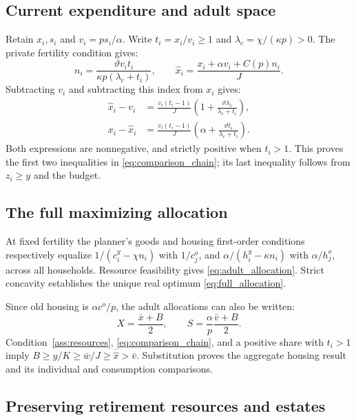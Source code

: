 \documentclass[11pt]{article}
\newcommand{\avg}[1]{\overline{#1}}
\begin{document}
\subsection{Current expenditure and adult space}

Retain $x_i,s_i$ and $v_i=ps_i/\alpha$. Write $t_i=x_i/v_i\ge1$ and
$\lambda_c=\chi/(\kappa p)>0$. The private fertility condition gives:
\begin{equation}
n_i=\frac{\vartheta v_i t_i}{\kappa p(\lambda_c+t_i)},\qquad
\widehat x_i=\frac{x_i+\alpha v_i+C(p)n_i}{J}.
\label{eq:index_identity}
\end{equation}
Subtracting $v_i$ and subtracting this index from $x_i$ gives:
\begin{align}
\widehat x_i-v_i
 &=\frac{v_i(t_i-1)}{J}
   \left(1+\frac{\vartheta\lambda_c}{\lambda_c+t_i}\right),\\
x_i-\widehat x_i
 &=\frac{v_i(t_i-1)}{J}
   \left(\alpha+\frac{\vartheta t_i}{\lambda_c+t_i}\right).
\end{align}
Both expressions are nonnegative, and strictly positive when $t_i>1$.
This proves the first two inequalities in \eqref{eq:comparison_chain};
its last inequality follows from $z_i\ge y$ and the budget.

\subsection{The full maximizing allocation}

At fixed fertility the planner's goods and housing first-order conditions
respectively equalize $1/(c_i^y-\chi n_i)$ with $1/c_j^o$, and
$\alpha/(h_i^y-\kappa n_i)$ with $\alpha/h_j^o$, across all households.
Resource feasibility gives \eqref{eq:adult_allocation}. Strict concavity
establishes the unique real optimum \eqref{eq:full_allocation}.

Since old housing is $\alpha c^o/p$, the adult allocations can also be
written:
\begin{equation}
X=\frac{\bar x+B}{2},\qquad
S=\frac{\alpha}{p}\frac{\bar v+B}{2}.
\end{equation}
Condition~\eqref{ass:resources}, \eqref{eq:comparison_chain}, and a positive
share with $t_i>1$ imply $B\ge y/K\ge\bar w/J\ge
\avg{\widehat x}>\bar v$. Substitution proves the aggregate housing result
and its individual and consumption comparisons.

\subsection{Preserving retirement resources and estates}
\end{document}

